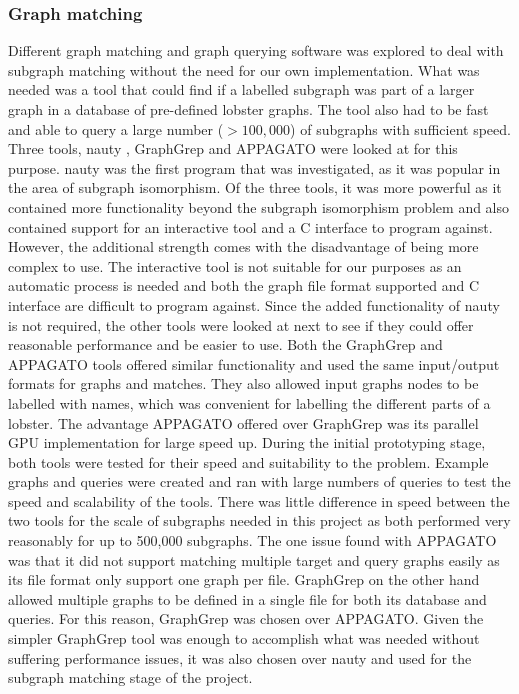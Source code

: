 \subsubsection{Graph matching}
Different graph matching and graph querying software was explored to deal with subgraph matching without the need for our own implementation. What was needed was a tool that could find if a labelled subgraph was part of a larger graph in a database of pre-defined lobster graphs. The tool also had to be fast and able to query a large number ($> 100,000$) of subgraphs with sufficient speed. Three tools, nauty \cite{nauty}, GraphGrep \cite{graphgrep} and APPAGATO \cite{appagato} were looked at for this purpose. 
\n
nauty was the first program that was investigated, as it was popular in the area of subgraph isomorphism. Of the three tools, it was more powerful as it contained more functionality beyond the subgraph isomorphism problem and also contained support for an interactive tool and a C interface to program against. However, the additional strength comes with the disadvantage of being more complex to use. The interactive tool is not suitable for our purposes as an automatic process is needed and both the graph file format supported and C interface are difficult to program against. Since the added functionality of nauty is not required, the other tools were looked at next to see if they could offer reasonable performance and be easier to use.
\n
Both the GraphGrep and APPAGATO tools offered similar functionality and used the same input/output formats for graphs and matches. They also allowed input graphs nodes to be labelled with names, which was convenient for labelling the different parts of a lobster. The advantage APPAGATO offered over GraphGrep was its parallel GPU implementation for large speed up. During the initial prototyping stage, both tools were tested for their speed and suitability to the problem. Example graphs and queries were created and ran with large numbers of queries to test the speed and scalability of the tools. There was little difference in speed between the two tools for the scale of subgraphs needed in this project as both performed very reasonably for up to 500,000 subgraphs. The one issue found with APPAGATO was that it did not support matching multiple target and query graphs easily as its file format only support one graph per file. GraphGrep on the other hand allowed multiple graphs to be defined in a single file for both its database and queries. For this reason, GraphGrep was chosen over APPAGATO. 
\n
Given the simpler GraphGrep tool was enough to accomplish what was needed without suffering performance issues, it was also chosen over nauty and used for the subgraph matching stage of the project.

